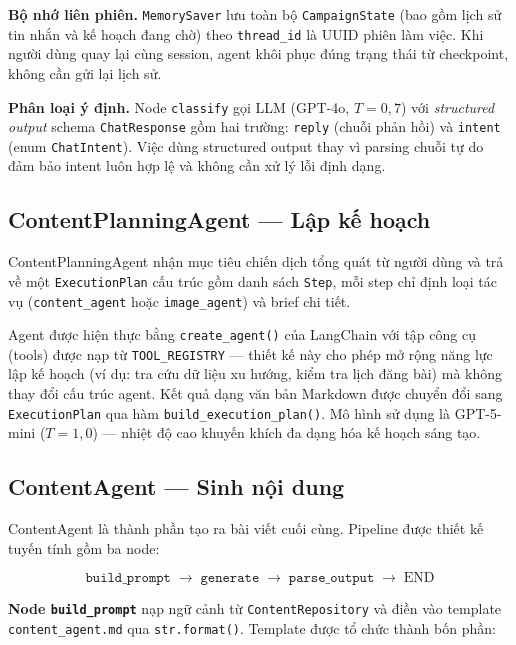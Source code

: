 \textbf{Bộ nhớ liên phiên.} \texttt{MemorySaver} lưu toàn bộ
\texttt{CampaignState} (bao gồm lịch sử tin nhắn và kế hoạch đang chờ)
theo \texttt{thread\_id} là UUID phiên làm việc. Khi người dùng quay
lại cùng session, agent khôi phục đúng trạng thái từ checkpoint, không
cần gửi lại lịch sử.

\textbf{Phân loại ý định.} Node \texttt{classify} gọi LLM (GPT-4o,
$T=0{,}7$) với \emph{structured output} schema \texttt{ChatResponse}
gồm hai trường: \texttt{reply} (chuỗi phản hồi) và \texttt{intent}
(enum \texttt{ChatIntent}). Việc dùng structured output thay vì parsing
chuỗi tự do đảm bảo intent luôn hợp lệ và không cần xử lý lỗi định
dạng.

\subsection{ContentPlanningAgent --- Lập kế hoạch}

ContentPlanningAgent nhận mục tiêu chiến dịch tổng quát từ người dùng
và trả về một \texttt{ExecutionPlan} cấu trúc gồm danh sách
\texttt{Step}, mỗi step chỉ định loại tác vụ (\texttt{content\_agent}
hoặc \texttt{image\_agent}) và brief chi tiết.

Agent được hiện thực bằng \texttt{create\_agent()} của LangChain với
tập công cụ (tools) được nạp từ \texttt{TOOL\_REGISTRY} --- thiết kế
này cho phép mở rộng năng lực lập kế hoạch (ví dụ: tra cứu dữ liệu
xu hướng, kiểm tra lịch đăng bài) mà không thay đổi cấu trúc agent.
Kết quả dạng văn bản Markdown được chuyển đổi sang
\texttt{ExecutionPlan} qua hàm \texttt{build\_execution\_plan()}. Mô
hình sử dụng là GPT-5-mini ($T=1{,}0$) --- nhiệt độ cao khuyến khích
đa dạng hóa kế hoạch sáng tạo.

\subsection{ContentAgent --- Sinh nội dung}

ContentAgent là thành phần tạo ra bài viết cuối cùng. Pipeline được
thiết kế tuyến tính gồm ba node:

\[
\texttt{build\_prompt} \;\to\; \texttt{generate} \;\to\; \texttt{parse\_output} \;\to\; \text{END}
\]

\textbf{Node \texttt{build\_prompt}} nạp ngữ cảnh từ
\texttt{ContentRepository} và điền vào template
\texttt{content\_agent.md} qua \texttt{str.format()}. Template được tổ
chức thành bốn phần:

